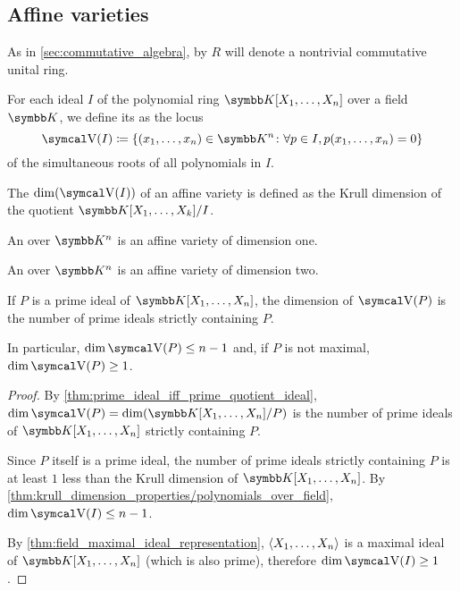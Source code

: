 \subsection{Affine varieties}\label{subsec:affine_varieties}

As in \cref{sec:commutative_algebra}, by \( R \) will denote a nontrivial commutative unital ring.

\begin{definition}\label{def:affine_variety}\cite[69]{Коцев2016}
  For each ideal \( I \) of the polynomial ring \( \K[X_1, \ldots, X_n] \) over a field \( \K \), we define its  as the locus
  \begin{equation*}
    \V(I) \coloneqq \{ (x_1, \ldots, x_n) \in \K^n \colon \forall p \in I, p(x_1, \ldots, x_n) = 0 \}
  \end{equation*}
  of the simultaneous roots of all polynomials in \( I \).

  \begin{defenum}
     The  \( \dim(\V(I)) \) of an affine variety is defined as the Krull dimension of the quotient \( \K[X_1, \ldots, X_k] / I \).

     An  over \( \K^n \) is an affine variety of dimension one.

     An  over \( \K^n \) is an affine variety of dimension two.
  \end{defenum}
\end{definition}

\begin{proposition}\label{thm:dimension_of_variety_of_prime_ideal}
  If \( P \) is a prime ideal of \( \K[X_1, \ldots, X_n] \), the dimension of \( \V(P) \) is the number of prime ideals strictly containing \( P \).

  In particular, \( \dim \V(P) \leq n - 1 \) and, if \( P \) is not maximal, \( \dim \V(P) \geq 1 \).
\end{proposition}
\begin{proof}
  By \cref{thm:prime_ideal_iff_prime_quotient_ideal}, \( \dim \V(P) = \dim(\K[X_1, \ldots, X_n] / P) \) is the number of prime ideals of \( \K[X_1, \ldots, X_n] \) strictly containing \( P \).

  Since \( P \) itself is a prime ideal, the number of prime ideals strictly containing \( P \) is at least \( 1 \) less than the Krull dimension of \( \K[X_1, \ldots, X_n] \). By \cref{thm:krull_dimension_properties/polynomials_over_field}, \( \dim \V(I) \leq n - 1 \).

  By \cref{thm:field_maximal_ideal_representation}, \( \left\langle X_1, \ldots, X_n \right\rangle \) is a maximal ideal of \( \K[X_1, \ldots, X_n] \) (which is also prime), therefore \( \dim \V(I) \geq 1 \).
\end{proof}

